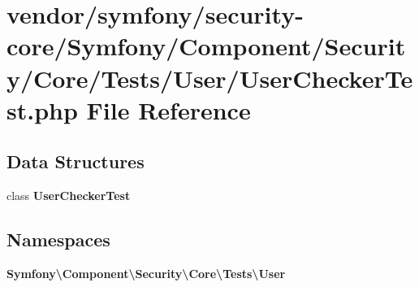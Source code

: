 \section{vendor/symfony/security-\/core/\+Symfony/\+Component/\+Security/\+Core/\+Tests/\+User/\+User\+Checker\+Test.php File Reference}
\label{_user_checker_test_8php}
\subsection*{Data Structures}
\begin{DoxyCompactItemize}
\item 
class {\bf User\+Checker\+Test}
\end{DoxyCompactItemize}
\subsection*{Namespaces}
\begin{DoxyCompactItemize}
\item 
 {\bf Symfony\textbackslash{}\+Component\textbackslash{}\+Security\textbackslash{}\+Core\textbackslash{}\+Tests\textbackslash{}\+User}
\end{DoxyCompactItemize}
